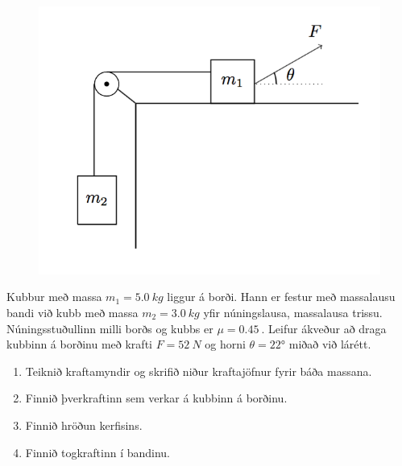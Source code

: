\ifdefined \wholebook \else\documentclass[oneside]{book}\usepackage{EdlBook}\graphicspath{{figures/}}
\begin{document}
\begin{enumerate}[label = \textbf{Dæmi \thechapter.\arabic*.}]
\begin{minipage}{\linewidth}
\begin{figure}
\includegraphics[width=1.8 in]{images/krafta.png}
\end{figure}

\item Kubbur með massa $m_1 = \SI{5.0}{kg}$ liggur á borði. Hann er festur með massalausu bandi við kubb með massa $m_2 = \SI{3.0}{kg}$ yfir núningslausa, massalausa trissu. Núningsstuðullinn milli borðs og kubbs er $\mu = \SI{0.45}{}$. Leifur ákveður að draga kubbinn á borðinu með krafti $F = \SI{52}{N}$ og horni $\theta = \ang{22}$ miðað við lárétt.

\end{minipage}

\begin{enumerate}[label = \textbf{(\alph*)}]
    \item Teiknið kraftamyndir og skrifið niður kraftajöfnur fyrir báða massana.
    
    \item Finnið þverkraftinn sem verkar á kubbinn á borðinu.
    
    \item Finnið hröðun kerfisins.
    
    \item Finnið togkraftinn í bandinu.
\end{enumerate}

\end{enumerate}

\ifdefined \wholebook \else
 \printindex
\end{document}
